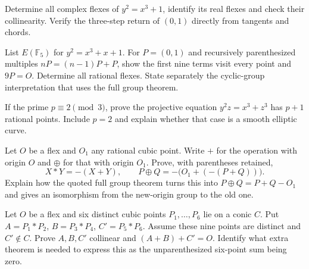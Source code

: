 \begin{exercise}[$\star\star$]\label{geometry:ex:flexesxcube}
Determine all complex flexes of $y^2=x^3+1$, identify its real flexes and check their collinearity. Verify the three-step return of $(0,1)$ directly from tangents and chords.
\end{exercise}
\begin{exercise}[$\star$]\label{geometry:ex:countfive}
List $E(\mathbb F_5)$ for $y^2=x^3+x+1$. For $P=(0,1)$ and recursively parenthesized multiples $nP=(n-1)P+P$, show the first nine terms visit every point and $9P=O$. Determine all rational flexes. State separately the cyclic-group interpretation that uses the full group theorem.
\end{exercise}
\begin{exercise}[$\star\star$]\label{geometry:ex:xcubeplusone}
If the prime $p\equiv2\pmod3$, prove the projective equation $y^2z=x^3+z^3$ has $p+1$ rational points. Include $p=2$ and explain whether that case is a smooth elliptic curve.
\end{exercise}
\begin{exercise}[$\star\star$]\label{geometry:ex:changeorigin}
Let $O$ be a flex and $O_1$ any rational cubic point. Write $+$ for the operation with origin $O$ and $\oplus$ for that with origin $O_1$. Prove, with parentheses retained,
\[
X*Y=-(X+Y),\qquad P\oplus Q=-\bigl(O_1+(-(P+Q))\bigr).
\]
Explain how the quoted full group theorem turns this into $P\oplus Q=P+Q-O_1$ and gives an isomorphism from the new-origin group to the old one.
\end{exercise}
\begin{exercise}[$\star\star\star$]\label{geometry:ex:sixonconic}
Let $O$ be a flex and six distinct cubic points $P_1,\ldots,P_6$ lie on a conic $C$. Put $A=P_1*P_2$, $B=P_3*P_4$, $C'=P_5*P_6$. Assume these nine points are distinct and $C'\notin C$. Prove $A,B,C'$ collinear and $(A+B)+C'=O$. Identify what extra theorem is needed to express this as the unparenthesized six-point sum being zero.
\end{exercise}

